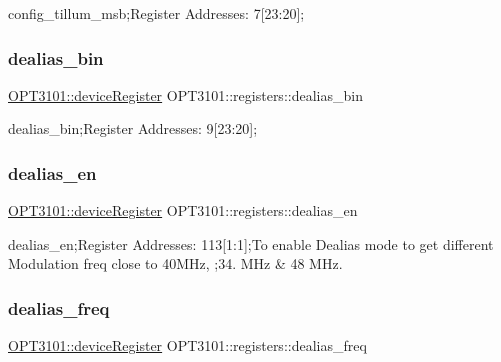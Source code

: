 config\+\_\+tillum\+\_\+msb;Register Addresses\+: 7\mbox{[}23\+:20\mbox{]}; 

\mbox{\label{class_o_p_t3101_1_1registers_a1faab11698859e9d42e148c1d8cd5d1e}} 
\subsubsection{\texorpdfstring{dealias\+\_\+bin}{dealias\_bin}}
{\footnotesize\ttfamily \mbox{\hyperlink{class_o_p_t3101_1_1device_register}{O\+P\+T3101\+::device\+Register}} O\+P\+T3101\+::registers\+::dealias\+\_\+bin}



dealias\+\_\+bin;Register Addresses\+: 9\mbox{[}23\+:20\mbox{]}; 

\mbox{\label{class_o_p_t3101_1_1registers_ac752e847ca54073862f6c642bd83790a}} 
\subsubsection{\texorpdfstring{dealias\+\_\+en}{dealias\_en}}
{\footnotesize\ttfamily \mbox{\hyperlink{class_o_p_t3101_1_1device_register}{O\+P\+T3101\+::device\+Register}} O\+P\+T3101\+::registers\+::dealias\+\_\+en}



dealias\+\_\+en;Register Addresses\+: 113\mbox{[}1\+:1\mbox{]};To enable Dealias mode to get different Modulation freq close to 40\+M\+Hz, ;34. M\+Hz \& 48 M\+Hz. 

\mbox{\label{class_o_p_t3101_1_1registers_ab12f738990fa7202d760daca80be5e22}} 
\subsubsection{\texorpdfstring{dealias\+\_\+freq}{dealias\_freq}}
{\footnotesize\ttfamily \mbox{\hyperlink{class_o_p_t3101_1_1device_register}{O\+P\+T3101\+::device\+Register}} O\+P\+T3101\+::registers\+::dealias\+\_\+freq}



